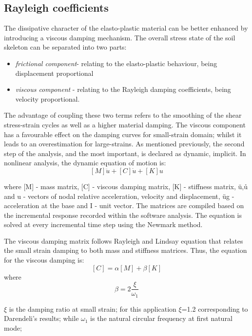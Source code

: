 \documentclass[10pt,a4paper]{report}
\begin{document}
\subsection{Rayleigh coefficients}
The dissipative character of the elasto-plastic material can be better enhanced by introducing a viscous damping mechanism. The overall stress state of the soil skeleton can be separated into two parts: 
		\begin{itemize}
	\item \textit{frictional component}- relating to the elasto-plastic behaviour, being displacement proportional
	\item \textit{viscous component} - relating to the Rayleigh damping coefficients, being velocity proportional. 
\end{itemize}


The advantage of coupling these two terms refers to the smoothing of the shear stress-strain cycles as well as a higher material damping. The viscous component has a favourable effect on the damping curves for small-strain domain; whilst it leads to an overestimation for large-strains. 
As mentioned previously, the second step of the analysis, and the most important, is declared as dynamic, implicit. In nonlinear analysis, the dynamic equation of motion is:
\begin{equation}
\left[M\right]{\ddot{u}}+\left[C\right]{\dot{u}}+\left[K\right]{u}
\end{equation}

where [M] - mass matrix, [C] - viscous damping matrix, [K] - stiffness matrix, {ü},{ů} and {u} - vectors of nodal relative acceleration, velocity and displacement, üg - acceleration at the base and {I} - unit vector. The matrices are compiled based on the incremental response recorded within the software analysis. The equation is solved at every incremental time step using the Newmark method.

The viscous damping matrix follows Rayleigh and Lindsay equation that relates the small strain damping to both mass and stiffness matrices. Thus, the equation for the viscous damping is:
\begin{equation}
	\left[C\right]=\alpha\left[M\right]+\beta\left[K\right]
\end{equation}
where
\begin{equation}
		\beta = 2\frac{\xi}{\omega_1}
\end{equation}


$\xi$ is the damping ratio at small strain; for this application $\xi$=1.2 corresponding to Darendeli's results; while $\omega_1$ is the natural circular frequency at first natural mode;
\end{document}
